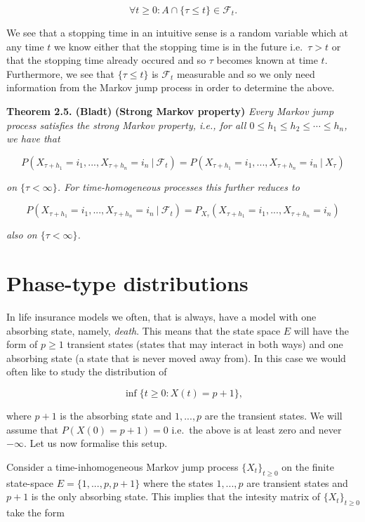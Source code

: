 \documentclass[a4paper,12pt,openany]{book}
\begin{document}
\[
\forall t\ge 0 : A\cap \{\tau\le t\}\in\mathcal{F}_t.
\]

We see that a stopping time in an intuitive sense is a random variable which at any time \(t\) we know either that the stopping time is in the future i.e.~\(\tau > t\) or that the stopping time already occured and so \(\tau\) becomes known at time \(t\). Furthermore, we see that \(\{\tau \le t\}\) is \(\mathcal{F}_t\) measurable and so we only need information from the Markov jump process in order to determine the above.

\textbf{Theorem 2.5. (Bladt)} \textbf{(Strong Markov property)} \emph{Every Markov jump process satisfies the strong Markov property, i.e., for all \(0\le h_1\le h_2\le \cdots \le h_n\), we have that}

\[
P(X_{\tau +h_1}=i_1,...,X_{\tau + h_n}=i_n\ \vert\ \mathcal{F}_t)=P(X_{\tau +h_1}=i_1,...,X_{\tau + h_n}=i_n\ \vert\ X_\tau)
\]

\emph{on \(\{\tau <\infty\}\). For time-homogeneous processes this further reduces to}

\[
P(X_{\tau +h_1}=i_1,...,X_{\tau + h_n}=i_n\ \vert\ \mathcal{F}_t)=P_{X_\tau}(X_{\tau +h_1}=i_1,...,X_{\tau + h_n}=i_n)
\]

\emph{also on \(\{\tau <\infty\}\).}

\hypertarget{phase-type-distributions}{%
\section{Phase-type distributions}\label{phase-type-distributions}}

In life insurance models we often, that is always, have a model with one absorbing state, namely, \emph{death}. This means that the state space \(E\) will have the form of \(p\ge 1\) transient states (states that may interact in both ways) and one absorbing state (a state that is never moved away from). In this case we would often like to study the distribution of

\[
\inf\{t\ge 0 : X(t)=p+1\},
\]

where \(p+1\) is the absorbing state and \(1,...,p\) are the transient states. We will assume that \(P(X(0)=p+1)=0\) i.e.~the above is at least zero and never \(-\infty\). Let us now formalise this setup.

Consider a time-inhomogeneous Markov jump process \(\{X_t\}_{t\ge 0}\) on the finite state-space \(E=\{1,...,p,p+1\}\) where the states \(1,...,p\) are transient states and \(p+1\) is the only absorbing state. This implies that the intesity matrix of \(\{X_t\}_{t\ge 0}\) take the form
\end{document}
